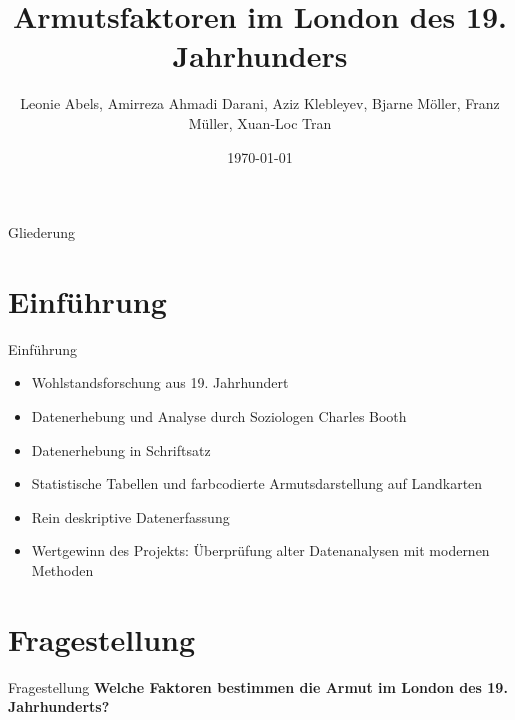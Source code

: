 \documentclass[aspectratio=169,xcolor=dvipsnames]{beamer}
\title[short title]{Armutsfaktoren im London des 19. Jahrhunders }
\author[Xuan-Loc Tran] {Leonie Abels, Amirreza Ahmadi Darani, Aziz Klebleyev, Bjarne Möller, Franz Müller, Xuan-Loc Tran}
\institute[NTU] %
{
    Data-Analytics \\
    Prof. Dr. Jill Klünder \\
    FHDW Hannover
    \vskip 3pt
}
\date{\today} %
\begin{document}
\begin{frame}
    \titlepage
\end{frame}

\begin{frame}{Gliederung}
    \tableofcontents
\end{frame}

\section{Einführung}


\begin{frame}{Einführung}
    \begin{itemize}
        \item Wohlstandsforschung aus 19. Jahrhundert
        \item Datenerhebung und Analyse durch Soziologen Charles Booth
        \item Datenerhebung in Schriftsatz
        \item Statistische Tabellen und farbcodierte Armutsdarstellung auf Landkarten
        \item Rein deskriptive Datenerfassung
        \item Wertgewinn des Projekts: Überprüfung alter Datenanalysen mit modernen Methoden
    \end{itemize}
\end{frame}

\section{Fragestellung}
\begin{frame}{Fragestellung}
    \textbf{Welche Faktoren bestimmen die Armut im London des 19. Jahrhunderts?}
\end{frame}
\end{document}
